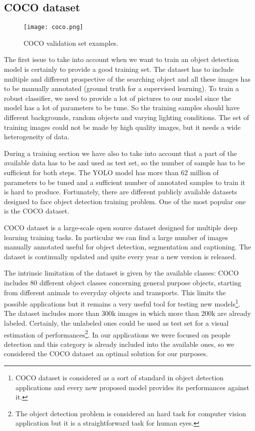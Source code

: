 \documentclass{standalone}
\begin{document}
\subsection[COCO]{COCO dataset}\label{obj_detection:coco}

\begin{center}
\begin{figure}[htbp]
\centering
\texttt{[image: coco.png]}
\caption{COCO validation set examples.
}
\label{fig:coco}
\end{figure}
\end{center}

The first issue to take into account when we want to train an object detection model is certainly to provide a good training set.
The dataset has to include multiple and different prospective of the searching object and all these images has to be manually annotated (ground truth for a supervised learning).
To train a robust classifier, we need to provide a lot of pictures to our model since the model has a lot of parameters to be tune.
So the training samples should have different backgrounds, random objects and varying lighting conditions.
The set of training images could not be made by high quality images, but it needs a wide heterogeneity of data.

During a training section we have also to take into account that a part of the available data has to be  and used as test set, so the number of sample has to be sufficient for both steps.
The YOLO model has more than 62 million of parameters to be tuned and a sufficient number of annotated samples to train it is hard to produce.
Fortunately, there are different publicly available datasets designed to face object detection training problem.
One of the most popular one is the COCO dataset.

COCO dataset is a large-scale open source dataset designed for multiple deep learning training tasks.
In particular we can find a large number of images manually annotated useful for object detection, segmentation and captioning.
The dataset is continually updated and quite every year a new version is released.

The intrinsic limitation of the dataset is given by the available classes: COCO includes 80 different object classes concerning general purpose objects, starting from different animals to everyday objects and transports.
This limits the possible applications but it remains a very useful tool for testing new models\footnote{
  COCO dataset is considered as a sort of standard in object detection applications and every new proposed model provides its performances against it.
}.
The dataset includes more than 300k images in which more than 200k are already labeled.
Certainly, the unlabeled ones could be used as test set for a visual estimation of performances\footnote{
  The object detection problem is considered an hard task for computer vision application but it is a straightforward task for human eyes.
}.
In our applications we were focused on people detection and this category is already included into the available ones, so we considered the COCO dataset an optimal solution for our purposes.
\end{document}
